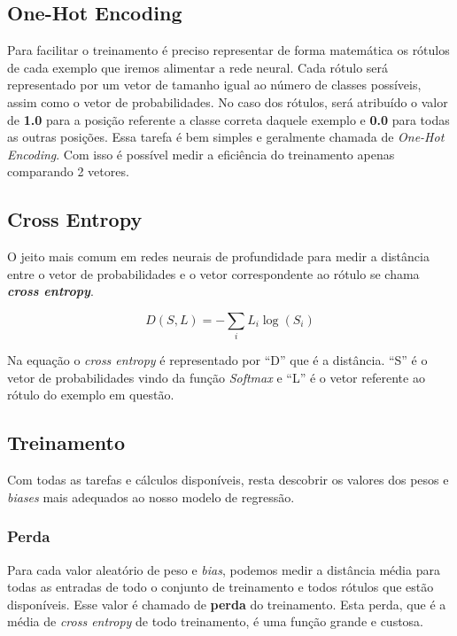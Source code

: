 \subsection{One-Hot Encoding}

Para facilitar o treinamento é preciso representar de forma matemática
os rótulos de cada exemplo que iremos alimentar a rede neural. Cada
rótulo será representado por um vetor de tamanho igual ao número de
classes possíveis, assim como o vetor de probabilidades. No caso dos
rótulos, será atribuído o valor de {\bf 1.0} para a posição referente
a classe correta daquele exemplo e {\bf 0.0} para todas as outras
posições. Essa tarefa é bem simples e geralmente chamada de
\textit{One-Hot Encoding}. Com isso é possível medir a eficiência do
treinamento apenas comparando 2 vetores.

\subsection{Cross Entropy}

O jeito mais comum em redes neurais de profundidade para medir a
distância entre o vetor de probabilidades e o vetor correspondente ao
rótulo se chama {\bf \emph{cross entropy}}.

\begin{equation}
   D(S,L) = - \displaystyle\sum_{i}L_i  {\log (S_i)}
\end{equation}

Na equação o \textit{cross entropy} é representado por ``D'' que é a
distância. ``S'' é o vetor de probabilidades vindo da função
\textit{Softmax} e ``L'' é o vetor referente ao rótulo do exemplo em
questão.

\subsection{Treinamento}

Com todas as tarefas e cálculos disponíveis, resta descobrir os
valores dos pesos e \textit{biases} mais adequados ao nosso modelo de
regressão.

\subsubsection{Perda}

Para cada valor aleatório de peso e \textit{bias}, podemos medir a
distância média para todas as entradas de todo o conjunto de
treinamento e todos rótulos que estão disponíveis. Esse valor é
chamado de {\bf perda} do treinamento. Esta perda, que é a média de
\textit{cross entropy} de todo treinamento, é uma função grande e
custosa.

